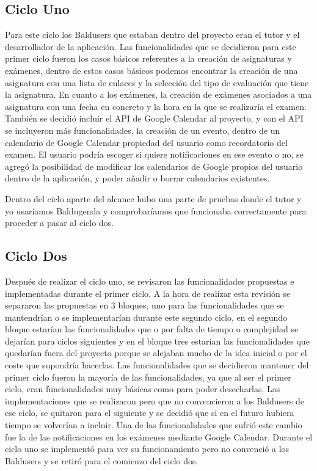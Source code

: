 \subsection{Ciclo Uno}
\label{subsecc:ciclo Uno}

Para este ciclo los Baldusers que estaban dentro del proyecto eran el tutor y el desarrollador de la aplicación. Las funcionalidades que se decidieron para este primer ciclo fueron los casos básicos referentes a la creación de asignaturas y exámenes, dentro de estos casos básicos podemos encontrar la creación de una asignatura con una lista de enlaces y la selección del tipo de evaluación que tiene la asignatura. En cuanto a los exámenes, la creación de exámenes asociados a una asignatura con una fecha en concreto y la hora en la que se realizaría el examen.
También se decidió incluir el API de Google Calendar al proyecto, y con el API se incluyeron más funcionalidades, la creación de un evento, dentro de un calendario de Google Calendar propiedad del usuario como recordatorio del examen. El usuario podría escoger si quiere notificaciones en ese evento o no, se agregó la  posibilidad de modificar los calendarios de Google propios del usuario dentro de la aplicación, y poder añadir o borrar calendarios existentes.
 
Dentro del ciclo aparte del alcance hubo una parte de pruebas donde el tutor y yo usaríamos Baldugenda y comprobaríamos que funcionaba correctamente para proceder a pasar al ciclo dos.


\subsection{Ciclo Dos}
\label{subsecc:ciclo Dos}

Después de realizar el ciclo uno, se revisaron las funcionalidades propuestas e implementadas durante el primer ciclo. A la hora de realizar esta revisión se separaron las propuestas en 3 bloques, uno para las funcionalidades que se mantendrían o se implementarían durante este segundo ciclo, en el segundo bloque estarían las funcionalidades que o por falta de tiempo o complejidad se dejarían para ciclos siguientes y en el bloque tres estarían las funcionalidades que quedarían fuera del proyecto porque se alejaban mucho de la idea inicial o por el coste que supondría hacerlas.
Las funcionalidades que se decidieron mantener del primer ciclo fueron la mayoría de las funcionalidades, ya que al ser el primer ciclo, eran funcionalidades muy básicas como para poder desecharlas. Las implementaciones que se realizaron pero que no convencieron a los Baldusers de ese ciclo, se quitaron para el siguiente y se decidió que si en el futuro hubiera tiempo se volverían a incluir. Una de las funcionalidades que sufrió este cambio fue la de las notificaciones en los exámenes mediante Google Calendar. Durante el ciclo uno se implementó para ver su funcionamiento pero no convenció a los Baldusers y se retiró para el comienzo del ciclo dos.

